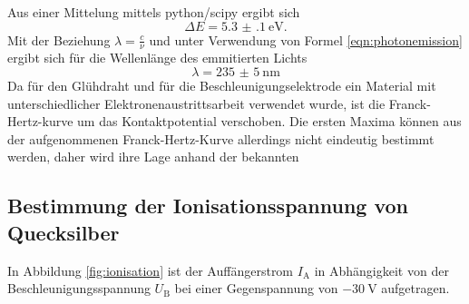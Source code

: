 Aus einer Mittelung mittels python/scipy \cite{scipy} ergibt sich
\begin{equation}
	\Delta E=\SI{5.3(1)}{\electronvolt} \mathrm{.}
\end{equation}
Mit der Beziehung $\lambda=\frac{c}{\nu}$ und unter Verwendung von Formel
\eqref{eqn:photonemission} ergibt sich für die Wellenlänge des emmitierten Lichts
\begin{equation}
	\lambda=\SI{235(5)}{\nano\meter}
\end{equation}
Da für den Glühdraht und für die Beschleunigungselektrode ein Material mit unterschiedlicher Elektronenaustrittsarbeit verwendet wurde, ist die Franck-Hertz-kurve um das Kontaktpotential verschoben.
Die ersten Maxima können aus der aufgenommenen Franck-Hertz-Kurve allerdings nicht eindeutig bestimmt werden, daher wird ihre Lage anhand der bekannten

\FloatBarrier
\subsection{Bestimmung der Ionisationsspannung von Quecksilber}
In Abbildung \ref{fig:ionisation} ist der Auffängerstrom $I_{\mathrm{A}}$ in Abhängigkeit
von der Beschleunigungsspannung $U_{\mathrm{B}}$ bei einer Gegenspannung von $-\SI{30}{\volt}$
aufgetragen.
